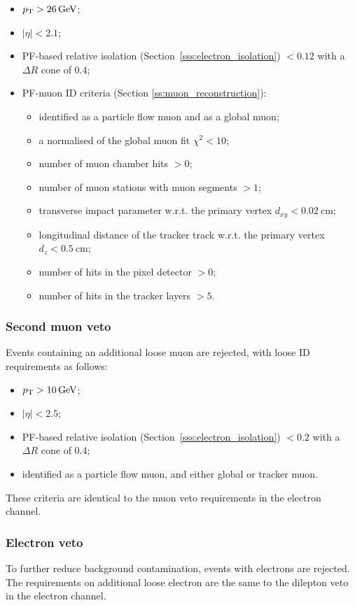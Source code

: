 \begin{itemize}
	\item $\pt > \SI{26}{\GeV}$;
	\item $|\eta| < 2.1$;
	\item PF-based relative isolation (Section~\ref{sss:electron_isolation}) \reliso $< 0.12$ with a $\Delta
R$ cone of \num{0.4};
	\item PF-muon ID criteria (Section \ref{ss:muon_reconstruction}):
	\begin{itemize}
		\item identified as a particle flow muon and as a global muon;
		\item a normalised of the global muon fit $\chi^2<10$;
		\item number of muon chamber hits $>0$;
		\item number of muon stations with muon segments $>1$;
		\item transverse impact parameter w.r.t. the primary vertex $d_{xy} < \SI{0.02}{\cm}$;
		\item longitudinal distance of the tracker track w.r.t. the primary vertex $d_z < \SI{0.5}{\cm}$;
		\item number of hits in the pixel detector $>0$;
		\item number of hits in the tracker layers $>5$.
	\end{itemize}
\end{itemize}

\subsubsection*{Second muon veto}
Events containing an additional loose muon are rejected, with loose ID requirements as follows:

\begin{itemize}
	\item $\pt > \SI{10}{\GeV}$;
	\item $|\eta| < 2.5$;
	\item PF-based relative isolation (Section~\ref{sss:electron_isolation}) \reliso $< 0.2$ with a $\Delta R$ cone of
	\num{0.4}; %
	\item identified as a particle flow muon, and either global or tracker muon.
\end{itemize}

These criteria are identical to the muon veto requirements in the electron channel.

\subsubsection*{Electron veto}
To further reduce background contamination, events with electrons are rejected. The requirements on additional loose
electron are the same to the dilepton veto in the electron channel.

